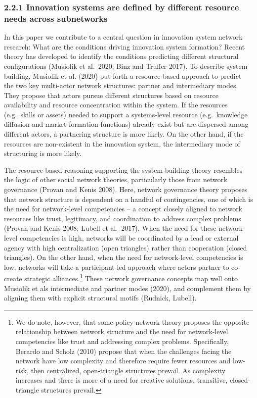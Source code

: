 \documentclass[twoside,12pt,final]{ucthesis-CA2012}
\begin{document}
\begin{ucmainmatter}
\hypertarget{innovation-systems-are-defined-by-different-resource-needs-across-subnetworks}{%
\subsubsection{2.2.1 Innovation systems are defined by different resource needs across subnetworks}\label{innovation-systems-are-defined-by-different-resource-needs-across-subnetworks}}

In this paper we contribute to a central question in innovation system
network research: What are the conditions driving innovation system
formation? Recent theory has developed to identify the conditions
predicting different structural configurations (Musiolik et al.~2020;
Binz and Truffer 2017). To describe system building, Musiolik et al.
(2020) put forth a resource-based approach to predict the two key
multi-actor network structures: partner and intermediary modes. They
propose that actors pursue different structures based on resource
availability and resource concentration within the system. If the
resources (e.g.~skills or assets) needed to support a systems-level
resource (e.g.~knowledge diffusion and market formation functions)
already exist but are dispersed among different actors, a partnering
structure is more likely. On the other hand, if the resources are
non-existent in the innovation system, the intermediary mode of
structuring is more likely.

The resource-based reasoning supporting the system-building theory
resembles the logic of other social network theories, particularly those
from network governance (Provan and Kenis 2008). Here, network
governance theory proposes that network structure is dependent on a
handful of contingencies, one of which is the \textquotesingle need for network-level
competencies\textquotesingle{} -- a concept closely aligned to network resources like
trust, legitimacy, and coordination to address complex problems (Provan
and Kenis 2008; Lubell et al.~2017). When the need for these
network-level competencies is high, networks will be coordinated by a
lead or external agency with high centralization (open triangles) rather
than cooperation (closed triangles). On the other hand, when the need
for network-level competencies is low, networks will take a
participant-led approach where actors partner to co-create strategic
alliances.\footnote{We do note, however, that some policy network theory proposes the
  opposite relationship between network structure and the need for
  network-level competencies like trust and addressing complex
  problems. Specifically, Berardo and Scholz (2010) propose that when
  the challenges facing the network have low complexity and therefore
  require fewer resources and low-risk, then centralized,
  open-triangle structures prevail. As complexity increases and there
  is more of a need for creative solutions, transitive,
  closed-triangle structures prevail.} These network governance concepts map well onto Musiolik
et al\textquotesingle s intermediate and partner modes (2020), and complement them by
aligning them with explicit structural motifs (Rudnick, Lubell).


\end{ucmainmatter}
\end{document}
